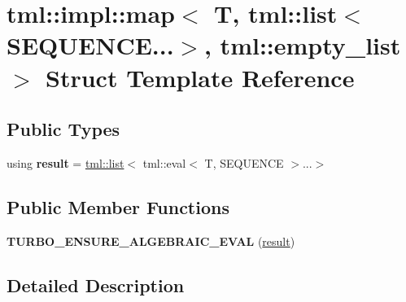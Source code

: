 \hypertarget{structtml_1_1impl_1_1map_3_01_t_00_01tml_1_1list_3_01_s_e_q_u_e_n_c_e_8_8_8_4_00_01tml_1_1empty__list_01_4}{\section{tml\+:\+:impl\+:\+:map$<$ T, tml\+:\+:list$<$ S\+E\+Q\+U\+E\+N\+C\+E...$>$, tml\+:\+:empty\+\_\+list $>$ Struct Template Reference}
\label{structtml_1_1impl_1_1map_3_01_t_00_01tml_1_1list_3_01_s_e_q_u_e_n_c_e_8_8_8_4_00_01tml_1_1empty__list_01_4}
}
\subsection*{Public Types}
\begin{DoxyCompactItemize}
\item 
\hypertarget{structtml_1_1impl_1_1map_3_01_t_00_01tml_1_1list_3_01_s_e_q_u_e_n_c_e_8_8_8_4_00_01tml_1_1empty__list_01_4_ac51367ef13b007294a796cb029e842c4}{using {\bfseries result} = \hyperlink{structtml_1_1list}{tml\+::list}$<$ tml\+::eval$<$ T, S\+E\+Q\+U\+E\+N\+C\+E $>$...$>$}\label{structtml_1_1impl_1_1map_3_01_t_00_01tml_1_1list_3_01_s_e_q_u_e_n_c_e_8_8_8_4_00_01tml_1_1empty__list_01_4_ac51367ef13b007294a796cb029e842c4}

\end{DoxyCompactItemize}
\subsection*{Public Member Functions}
\begin{DoxyCompactItemize}
\item 
\hypertarget{structtml_1_1impl_1_1map_3_01_t_00_01tml_1_1list_3_01_s_e_q_u_e_n_c_e_8_8_8_4_00_01tml_1_1empty__list_01_4_a02dabc90a1e455496535cd61c53ae76c}{{\bfseries T\+U\+R\+B\+O\+\_\+\+E\+N\+S\+U\+R\+E\+\_\+\+A\+L\+G\+E\+B\+R\+A\+I\+C\+\_\+\+E\+V\+A\+L} (\hyperlink{structtml_1_1list}{result})}\label{structtml_1_1impl_1_1map_3_01_t_00_01tml_1_1list_3_01_s_e_q_u_e_n_c_e_8_8_8_4_00_01tml_1_1empty__list_01_4_a02dabc90a1e455496535cd61c53ae76c}

\end{DoxyCompactItemize}


\subsection{Detailed Description}

